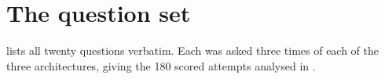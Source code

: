 \section{The question set}
\label{app:questions}

 lists all twenty questions verbatim. Each was asked three
times of each of the three architectures, giving the 180 scored attempts
analysed in .

\begin{widetab}[htbp]
\centering
\scriptsize

\caption{The twenty benchmark questions. \texttt{T1} single-document semantic,
\texttt{T2} structured aggregation, \texttt{T3} multi-hop relational plus text,
\texttt{T4} cross-document entity resolution.}
\label{tab:questions}
\end{widetab}
